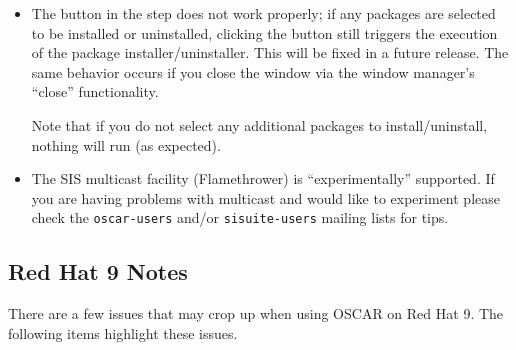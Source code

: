 \begin{itemize}
\item The  button in the  step does not work properly; if any packages are selected
  to be installed or uninstalled, clicking the  button
  still triggers the execution of the package installer/uninstaller.
  This will be fixed in a future release.  The same behavior occurs if
  you close the window via the window manager's ``close''
  functionality.

  Note that if you do not select any additional packages to
  install/uninstall, nothing will run (as expected).

\item The SIS multicast facility (Flamethrower) is ``experimentally''
  supported.  If you are having problems with multicast and would like
  to experiment please check the {\tt oscar-users} and/or
  {\tt sisuite-users} mailing lists for tips.




\end{itemize}


\subsection{Red Hat 9 Notes}
\label{subsec:rh90notes}

There are a few issues that may crop up when using OSCAR on Red Hat 9.
The following items highlight these issues.

